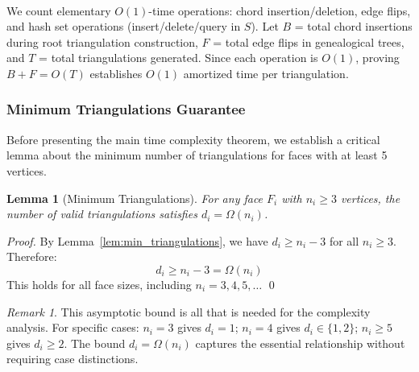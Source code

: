 ﻿﻿\documentclass[12pt,a4paper]{article}
\newtheorem{lemma}[theorem]{Lemma}
\theoremstyle{definition}
\theoremstyle{remark}
\newtheorem{remark}{Remark}
\begin{document}
We count elementary $O(1)$-time operations: chord insertion/deletion, edge flips, and hash set operations (insert/delete/query in $S$). Let $B$ = total chord insertions during root triangulation construction, $F$ = total edge flips in genealogical trees, and $T$ = total triangulations generated. Since each operation is $O(1)$, proving $B + F = O(T)$ establishes $O(1)$ amortized time per triangulation.

\subsubsection{Minimum Triangulations Guarantee}

Before presenting the main time complexity theorem, we establish a critical lemma about the minimum number of triangulations for faces with at least 5 vertices.

\begin{lemma}[Minimum Triangulations]
	\label{lem:min_triangulations_simplified}
	For any face $F_i$ with $n_i \geq 3$ vertices, the number of valid triangulations satisfies $d_i = \Omega(n_i)$.
\end{lemma}

\begin{proof}
	By Lemma~\ref{lem:min_triangulations}, we have $d_i \geq n_i - 3$ for all $n_i \geq 3$. Therefore:
	\[
		d_i \geq n_i - 3 = \Omega(n_i)
	\]
	This holds for all face sizes, including $n_i = 3, 4, 5, \ldots$ \qed
\end{proof}

\begin{remark}
	This asymptotic bound is all that is needed for the complexity analysis. For specific cases: $n_i = 3$ gives $d_i = 1$; $n_i = 4$ gives $d_i \in \{1,2\}$; $n_i \geq 5$ gives $d_i \geq 2$. The bound $d_i = \Omega(n_i)$ captures the essential relationship without requiring case distinctions.
\end{remark}
\end{document}
